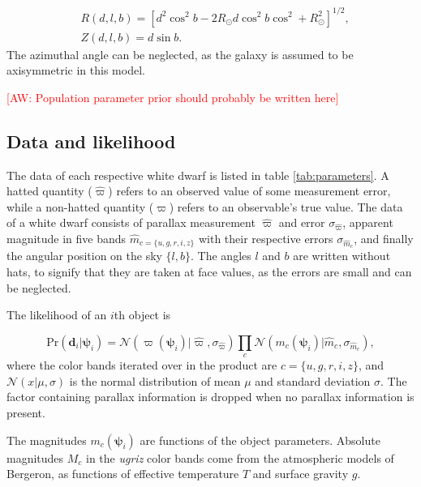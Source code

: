 \documentclass[fleqn,usenatbib]{mnras}
\newcommand{\aw}[1]{\textcolor{red}{[AW: #1]}}
\newcommand{\objp}{\boldsymbol{\psi}}
\newcommand{\data}{\mathbf{d}}
\newcommand{\Teff}{T}
\newcommand{\logg}{g}
\newcommand{\pr}{\text{Pr}}
\begin{document}
\begin{equation}
\begin{split}
	& R(d,l,b) = [d^2\cos^2b-2 R_\odot d \cos^2b\cos^2+R_\odot^2]^{1/2}, \\
	& Z(d,l,b) = d \sin b.
\end{split}
\end{equation}
The azimuthal angle can be neglected, as the galaxy is assumed to be axisymmetric in this model.

\aw{Population parameter prior should probably be written here}







\subsection{Data and likelihood}\label{sec:data}

The data of each respective white dwarf is listed in table \ref{tab:parameters}. A hatted quantity ($\hat{\varpi}$) refers to an observed value of some measurement error, while a non-hatted quantity ($\varpi$) refers to an observable's true value. The data of a white dwarf consists of parallax measurement $\hat{\varpi}$ and error $\sigma_{\hat{\varpi}}$, apparent magnitude in five bands $\hat{m}_{c=\{u,g,r,i,z\}}$ with their respective errors $\sigma_{\hat{m}_c}$, and finally the angular position on the sky $\{l,b\}$. The angles $l$ and $b$ are written without hats, to signify that they are taken at face values, as the errors are small and can be neglected.

The likelihood of an $i$th object is

\begin{equation}\label{eq:likelihood}
	\pr(\data_i | \objp_i) = \mathcal{N}(\varpi(\objp_i)|\hat{\varpi},\sigma_{\hat{\varpi}})\prod_{c} \mathcal{N}(m_c(\objp_i)|\hat{m}_c,\sigma_{\hat{m}_c}),
\end{equation}
where the color bands iterated over in the product are $c = \{u,g,r,i,z\}$, and $\mathcal{N}(x | \mu,\sigma)$ is the normal distribution of mean $\mu$ and standard deviation $\sigma$. The factor containing parallax information is dropped when no parallax information is present.

The magnitudes $m_c(\objp_i)$ are functions of the object parameters. Absolute magnitudes $M_c$ in the \emph{ugriz} color bands come from the atmospheric models of Bergeron, as functions of effective temperature $\Teff$ and surface gravity $\logg$.
\end{document}
